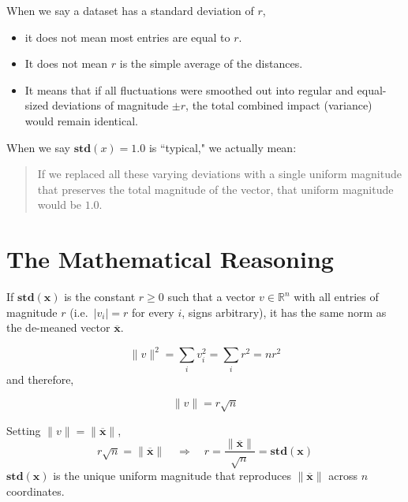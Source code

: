 \documentclass[12pt]{article}
\newcommand{\MVec}[1]{\mathbf{#1}}
\begin{document}
When we say a dataset has a standard deviation of $r$,
\begin{itemize}
    \item it does not mean most entries are equal to $r$.
    \item It does not mean $r$ is the simple average of the distances.
    \item It means that if all fluctuations were smoothed out
          into regular and equal-sized deviations of
          magnitude $\pm r$, the total combined impact
          (variance) would remain identical.
\end{itemize}

When we say $\mathbf{std}(x) = 1.0$ is ``typical,"
we actually mean:
\begin{quote}
    If we replaced all these varying deviations with a single
    uniform magnitude that preserves the total magnitude
    of the vector, that uniform magnitude would be $1.0$.
\end{quote}

\section*{The Mathematical Reasoning}
\noindent If $\mathbf{std}(\MVec{x})$ is the constant $r \ge 0$
such that a vector $v \in \mathbb{R}^n$ with all entries
of magnitude $r$ (i.e.\ $|v_i| = r$ for every $i$, signs arbitrary),
it has the same norm as the de-meaned vector $\overline{\MVec{x}}$.

\[
    \|v\|^2 = \sum_i v_i^2 = \sum_i r^2 = n r^2
\]
and therefore,

\[
    \|v\| = r\sqrt{n}
\]

\noindent Setting $\|v\| = \|\overline{\MVec{x}}\|$,
\[
    r\sqrt{n} = \|\overline{\MVec{x}}\|
        \quad\Longrightarrow\quad r
        = \frac{\|\overline{\MVec{x}}\|}{\sqrt{n}}
        = \mathbf{std}(\MVec{x})
\]
\noindent $\mathbf{std}(\MVec{x})$ is the unique uniform magnitude
that reproduces $\|\overline{\MVec{x}}\|$ across $n$ coordinates.
\end{document}
